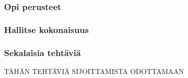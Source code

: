 \begin{tehtavasivu}

\subsubsection*{Opi perusteet}

\subsubsection*{Hallitse kokonaisuus}

\subsubsection*{Sekalaisia tehtäviä}

TÄHÄN TEHTÄVIÄ SIJOITTAMISTA ODOTTAMAAN

\end{tehtavasivu}